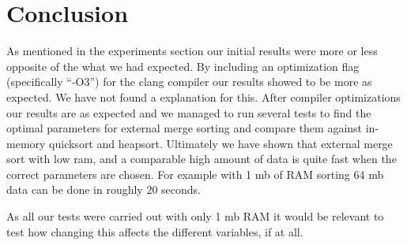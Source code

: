 \section{Conclusion}
As mentioned in the experiments section our initial results were more or less opposite of the what we had expected. By including an optimization flag (specifically ``-O3'') for the clang compiler our results showed to be more as expected. We have not found a explanation for this.
After compiler optimizations our results are as expected and we managed to run several tests to find the optimal parameters for external merge sorting and compare them against in-memory quicksort and heapsort. Ultimately we have shown that external merge sort with low ram, and a comparable high amount of data is quite fast when the correct parameters are chosen. For example with 1 mb of RAM sorting 64 mb data can be done in roughly 20 seconds.

As all our tests were carried out with only 1 mb RAM it would be relevant to test how changing this affects the different variables, if at all.